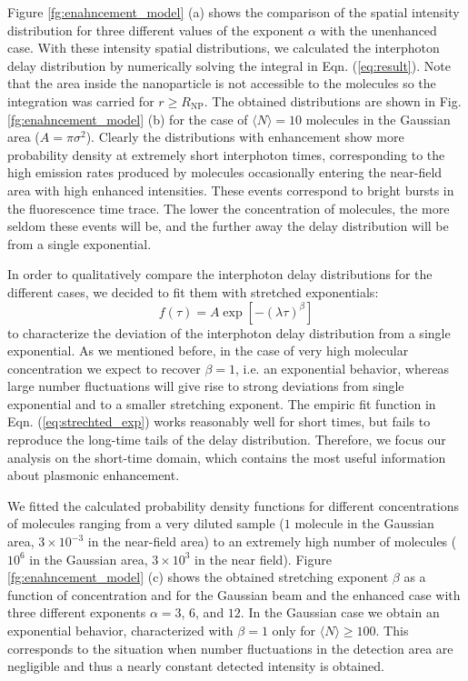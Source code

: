 Figure \ref{fg:enahncement_model} (a) shows the comparison 
of the spatial intensity distribution for three different 
values of the exponent $\alpha$ with the unenhanced case. 
With these intensity spatial distributions, we calculated the interphoton
delay distribution by numerically solving the integral in Eqn. (\ref{eq:result}). 
Note that the area inside the nanoparticle is not accessible 
to the molecules so the integration was carried for $r \geq R_\textrm{NP}$.
The obtained distributions are shown in Fig. \ref{fg:enahncement_model} (b) 
for the case of $\langle N \rangle=10$ molecules in the Gaussian area ($A=\pi \sigma^2$).  
Clearly the distributions with enhancement show more probability density at extremely 
short interphoton times, corresponding to the high emission rates produced by 
molecules occasionally entering the near-field area with high enhanced intensities. 
These events correspond to bright bursts in the fluorescence time trace. 
The lower the concentration of molecules, the more seldom these events will be, 
and the further away the delay distribution will be from a single exponential. 

In order to qualitatively compare the interphoton delay distributions for the 
different cases, we decided to fit them with stretched exponentials:
\begin{equation}
f(\tau) = A \exp\left[ -(\lambda \tau)^\beta\right]
\label{eq:strechted_exp}
\end{equation}
to characterize the deviation of the interphoton delay distribution from a single 
exponential. As we mentioned before, in the case of very high molecular concentration 
we expect to recover $\beta=1$, i.e. an exponential behavior, whereas large number 
fluctuations will give rise to strong deviations from single exponential and to a smaller 
stretching exponent. The empiric fit function in Eqn. (\ref{eq:strechted_exp})
works reasonably well for short times, but fails to reproduce the long-time tails of the 
delay distribution. Therefore, we focus our analysis on the short-time domain, which contains 
the most useful information about plasmonic enhancement.


We fitted the calculated probability density functions for different concentrations of molecules
ranging from a very diluted sample ($1$ molecule in the Gaussian area, $3\times10^{-3}$ 
in the near-field area) to an extremely 
high number of molecules ($10^{6}$ in the Gaussian area, $3\times10^{3}$ in the near field). 
Figure \ref{fg:enahncement_model} (c) 
shows the obtained stretching exponent $\beta$ as a function of concentration and for the Gaussian
beam and the enhanced case with three different exponents $\alpha =3$, $6$, and $12$.
In the Gaussian case we obtain an exponential behavior, 
characterized with $\beta=1$ only for $\langle N \rangle \geq 100$. This corresponds
to the situation when number fluctuations in the
detection area are negligible and thus a nearly constant detected intensity is obtained. 

